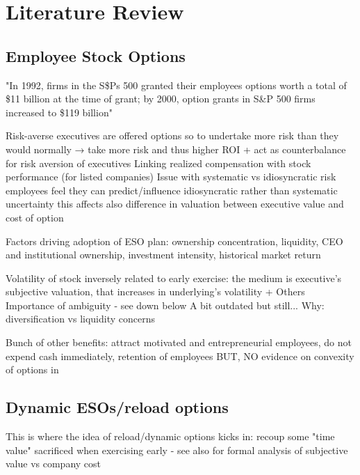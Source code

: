 \section{Literature Review}

\subsection{Employee Stock Options} %

    "In 1992, firms in the S\$Ps 500 granted their employees options worth a total of \$11 billion at the time of grant; by 2000, option grants in S\&P 500 firms increased to \$119 billion" \cite{hall2003trouble}

    Risk-averse executives are offered options so to undertake more risk than they would normally → take more risk and thus higher ROI + act as counterbalance for risk aversion of executives
    Linking realized compensation with stock performance (for listed companies)
    Issue with systematic vs idiosyncratic risk  \cite{armstrong2012executive} \cite{heron2017stock}
        employees feel they can predict/influence idiosyncratic rather than systematic uncertainty
        this affects also difference in valuation between executive value and cost of option \cite{meulbroek2001efficiency}

    Factors driving adoption of ESO plan: ownership concentration, liquidity, CEO and institutional ownership, investment intensity, historical market return \cite{pasternack2002factors}

    Volatility of stock inversely related to early exercise: the medium is executive's subjective valuation, that increases in underlying's volatility \cite{heron2017stock} \cite{izhakian2017risk} + Others
    Importance of ambiguity - see down below 
    A bit outdated but still... \cite{huddart1996employee}
    Why: diversification vs liquidity concerns \cite{murphy2019employees}


    Bunch of other benefits: attract motivated and entrepreneurial employees, do not expend cash immediately, retention of employees  \cite{hall2003trouble}
    BUT, NO evidence on convexity of options in \cite{hayes2012stock}

\subsection{Dynamic ESOs/reload options} %
    This is where the idea of reload/dynamic options kicks in: recoup some "time value" sacrificed when exercising early - see also \cite{hall2002stock} for formal analysis of subjective value vs company cost

